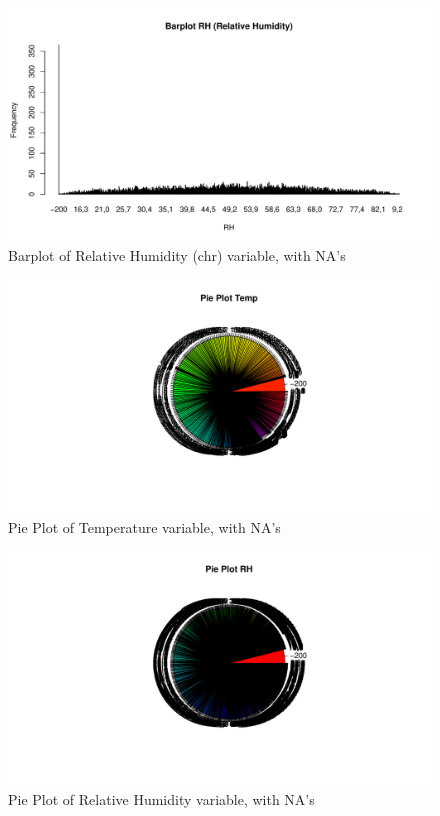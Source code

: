 \documentclass{article}
\begin{document}
\begin{figure}[H]
   \centering
   \includegraphics[width=\linewidth]{images/barplotRH.pdf}
   \caption{Barplot of Relative Humidity (chr) variable, with NA's}
   \label{fig:fig3}
\end{figure}
\begin{figure}[H]
   \centering
   \includegraphics[width=\linewidth]{images/pieplottemp.pdf}
   \caption{Pie Plot of Temperature variable, with NA's}
   \label{fig:fig4}
\end{figure}
\begin{figure}[H]
   \centering
   \includegraphics[width=\linewidth]{images/pieplotRH.pdf}
   \caption{Pie Plot of Relative Humidity variable, with NA's}
   \label{fig:fig5}
\end{figure}
\end{document}
